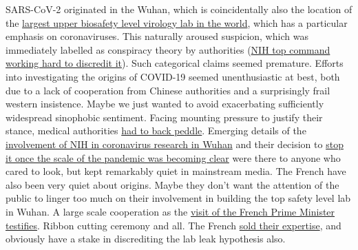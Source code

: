 \documentclass[11pt,a4paper,notitlepage]{report}
\begin{document}
SARS-CoV-2 originated in the Wuhan, which is coincidentally also the location of the \href{https://theconversation.com/fifty-nine-labs-around-world-handle-the-deadliest-pathogens-only-a-quarter-score-high-on-safety-161777}{largest upper biosafety level virology lab in the world}, which has a particular emphasis on coronaviruses. This naturally aroused suspicion, which was immediately labelled as conspiracy theory by authorities (\href{https://nypost.com/2022/01/11/fauci-called-wuhan-lab-leak-theory-shiny-object-in-april-2020-email/}{NIH top command working hard to discredit it}). Such categorical claims seemed premature. Efforts into investigating the origins of COVID-19 seemed unenthusiastic at best, both due to a lack of cooperation from Chinese authorities and a surprisingly frail western insistence. Maybe we just wanted to avoid exacerbating sufficiently widespread sinophobic sentiment. Facing mounting pressure to justify their stance, medical authorities \href{https://www.theguardian.com/world/2021/jul/16/who-chief-says-push-to-discount-lab-leak-theory-was-premature}{had to back peddle}. Emerging details of the \href{https://www.vanityfair.com/news/2021/10/nih-admits-funding-risky-virus-research-in-wuhan}{involvement of NIH in coronavirus research in Wuhan} and their decision to \href{https://www.the-scientist.com/news-opinion/nih-cancels-funding-for-bat-coronavirus-research-project-67486}{stop it once the scale of the pandemic was becoming clear} were there to anyone who cared to look, but kept remarkably quiet in mainstream media. The French have also been very quiet about origins. Maybe they don't want the attention of the public to linger too much on their involvement in building the top safety level lab in Wuhan. A large scale cooperation as the \href{http://english.whiov.cas.cn/ne/201802/t20180208_189991.html}{visit of the French Prime Minister testifies}. Ribbon cutting ceremony and all. The French \href{https://www.challenges.fr/entreprise/sante-et-pharmacie/revelations-l-histoire-secrete-du-laboratoire-p4-de-wuhan-vendu-par-la-france-a-la-chine_707425}{sold their expertise}, and obviously have a stake in discrediting the lab leak hypothesis also. 
\end{document}
